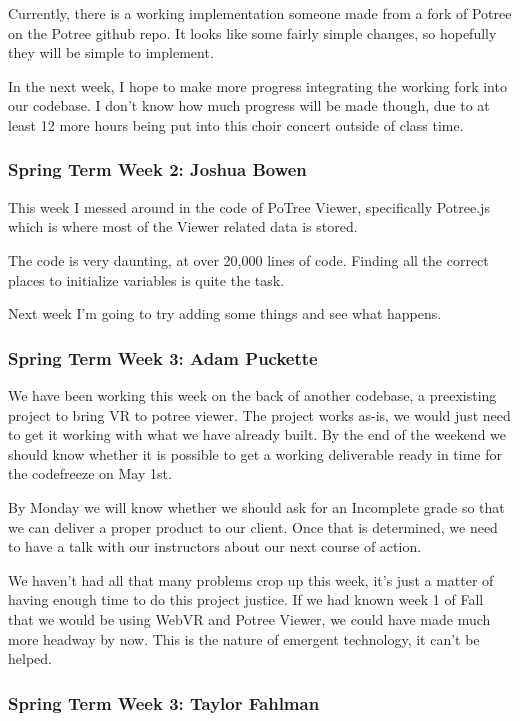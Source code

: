 \documentclass[draftclsnofoot,onecolumn]{IEEEtran}
\begin{document}
Currently, there is a working implementation someone made from a fork of Potree on the Potree github repo. It looks like some fairly simple changes, so hopefully they will be simple to implement.

In the next week, I hope to make more progress integrating the working fork into our codebase. I don't know how much progress will be made though, due to at least 12 more hours being put into this choir concert outside of class time.

\subsubsection{Spring Term Week 2: Joshua Bowen}

This week I messed around in the code of PoTree Viewer, specifically Potree.js which is where most of the Viewer related data is stored.

The code is very daunting, at over 20,000 lines of code. Finding all the correct places to initialize variables is quite the task.

Next week I'm going to try adding some things and see what happens.

\subsubsection{Spring Term Week 3: Adam Puckette}

We have been working this week on the back of another codebase, a preexisting project to bring VR to potree viewer. The project works as-is, we would just need to get it working with what we have already built. By the end of the weekend we should know whether it is possible to get a working deliverable ready in time for the codefreeze on May 1st.

By Monday we will know whether we should ask for an Incomplete grade so that we can deliver a proper product to our client. Once that is determined, we need to have a talk with our instructors about our next course of action.

We haven't had all that many problems crop up this week, it's just a matter of having enough time to do this project justice. If we had known week 1 of Fall that we would be using WebVR and Potree Viewer, we could have made much more headway by now. This is the nature of emergent technology, it can't be helped.

\subsubsection{Spring Term Week 3: Taylor Fahlman}
\end{document}
